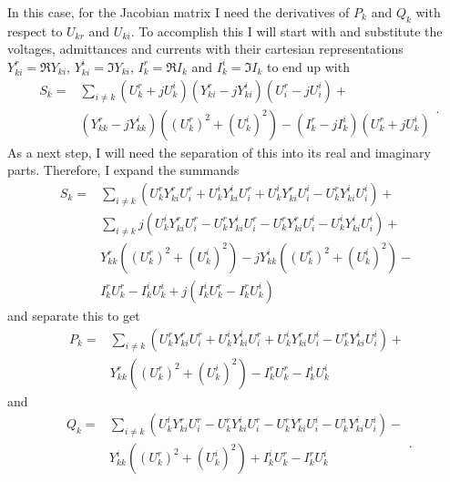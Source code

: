 In this case, for the Jacobian matrix I need the derivatives of $P_k$ and $Q_k$ with respect to $U_{kr}$ and $U_{ki}$. To accomplish this I will start with  and substitute the voltages, admittances and currents with their cartesian representations $Y_{ki}^r = \Re{Y_{ki}}$, $Y_{ki}^i = \Im{Y_{ki}}$, $I_k^r = \Re{I_k}$ and $I_k^i = \Im{I_k}$ to end up with
\begin{equation}
	\begin{split}
		S_k = & \sum_{i \ne k} (U_k^r + j U_k^i) (Y_{ki}^r - j Y_{ki}^i) (U_i^r - j U_i^i) + \\
			  & (Y_{kk}^r - j Y_{kk}^i) ( (U_k^r)^2 + (U_k^i)^2 ) - (I_k^r - j I_k^i) (U_k^r + j U_k^i)			
	\end{split}.
\end{equation}
As a next step, I will need the separation of this into its real and imaginary parts. Therefore, I expand the summands
\begin{equation}
	\begin{split}
		S_k = & \sum_{i \ne k} \left( U_k^r Y_{ki}^r U_i^r + U_k^i Y_{ki}^i U_i^r + U_k^i Y_{ki}^r U_i^i - U_k^r Y_{ki}^i U_i^i \right) + \\
			  & \sum_{i \ne k} j \left( U_k^i Y_{ki}^r U_i^r - U_k^r Y_{ki}^i U_i^r - U_k^r Y_{ki}^r U_i^i - U_k^i Y_{ki}^i U_i^i \right) + \\
			  & Y_{kk}^r ( (U_k^r)^2 + (U_k^i)^2 ) - j Y_{kk}^i ( (U_k^r)^2 + (U_k^i)^2 ) - \\
			  & I_k^r U_k^r - I_k^i U_k^i + j (I_k^i U_k^r - I_k^r U_k^i)
	\end{split}
\end{equation}
and separate this to get
\begin{equation}
	\begin{split}
		P_k = & \sum_{i \ne k} \left( U_k^r Y_{ki}^r U_i^r + U_k^i Y_{ki}^i U_i^r + U_k^i Y_{ki}^r U_i^i - U_k^r Y_{ki}^i U_i^i \right) + \\
			  & Y_{kk}^r ( (U_k^r)^2 + (U_k^i)^2 ) - I_k^r U_k^r - I_k^i U_k^i
	\end{split}
\end{equation}
and
\begin{equation}
	\begin{split}
		Q_k = & \sum_{i \ne k} \left( U_k^i Y_{ki}^r U_i^r - U_k^r Y_{ki}^i U_i^r - U_k^r Y_{ki}^r U_i^i - U_k^i Y_{ki}^i U_i^i \right) - \\
			  & Y_{kk}^i ( (U_k^r)^2 + (U_k^i)^2 ) + I_k^i U_k^r - I_k^r U_k^i
	\end{split}.
\end{equation}

